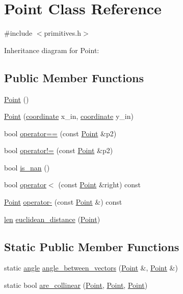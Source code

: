 \hypertarget{class_point}{}\section{Point Class Reference}
\label{class_point}


{\ttfamily \#include $<$primitives.\+h$>$}



Inheritance diagram for Point\+:
\subsection*{Public Member Functions}
\begin{DoxyCompactItemize}
\item 
\mbox{\hyperlink{class_point_ad92f2337b839a94ce97dcdb439b4325a}{Point}} ()
\item 
\mbox{\hyperlink{class_point_af7373698b9fafc53b0a5d06e511642e1}{Point}} (\mbox{\hyperlink{primitives_8h_a9949b5198385a93773b854932cb22e08}{coordinate}} x\+\_\+in, \mbox{\hyperlink{primitives_8h_a9949b5198385a93773b854932cb22e08}{coordinate}} y\+\_\+in)
\item 
bool \mbox{\hyperlink{class_point_ac7bc64b9a683d5fb35780c739779f2fc}{operator==}} (const \mbox{\hyperlink{class_point}{Point}} \&p2)
\item 
bool \mbox{\hyperlink{class_point_ade5f3908ec0e412aea8c3e12f5d0e26f}{operator!=}} (const \mbox{\hyperlink{class_point}{Point}} \&p2)
\item 
bool \mbox{\hyperlink{class_point_a2bc8aed929f6be2b543ba2f26b8a5f72}{is\+\_\+nan}} ()
\item 
bool \mbox{\hyperlink{class_point_a2d285a505e84d64a96974d5247e8ae7a}{operator$<$}} (const \mbox{\hyperlink{class_point}{Point}} \&right) const
\item 
\mbox{\hyperlink{class_point}{Point}} \mbox{\hyperlink{class_point_aa3b47f3a3a36f3653f0b1e26dd197257}{operator-\/}} (const \mbox{\hyperlink{class_point}{Point}} \&) const
\item 
\mbox{\hyperlink{primitives_8h_a0daa439ba651ea0fd8d02392244db601}{len}} \mbox{\hyperlink{class_point_aa87b9392648b5001da929ba90f205c4d}{euclidean\+\_\+distance}} (\mbox{\hyperlink{class_point}{Point}})
\end{DoxyCompactItemize}
\subsection*{Static Public Member Functions}
\begin{DoxyCompactItemize}
\item 
static \mbox{\hyperlink{primitives_8h_a41ee332ff1a31807cb838b616c186dd7}{angle}} \mbox{\hyperlink{class_point_a188e0a4a3b9df9e76c749f2139ad0611}{angle\+\_\+between\+\_\+vectors}} (\mbox{\hyperlink{class_point}{Point}} \&, \mbox{\hyperlink{class_point}{Point}} \&)
\item 
static bool \mbox{\hyperlink{class_point_a42bd18d21ff628166cc827871f7df960}{are\+\_\+collinear}} (\mbox{\hyperlink{class_point}{Point}}, \mbox{\hyperlink{class_point}{Point}}, \mbox{\hyperlink{class_point}{Point}})
\end{DoxyCompactItemize}
